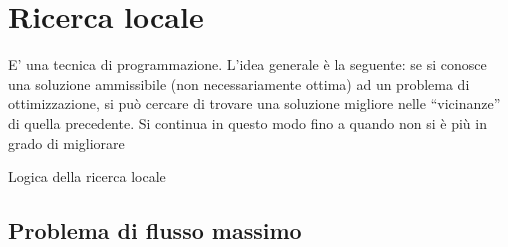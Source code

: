 
\ifsubfile
\usepackage{../settings/subfile}
\setcounter{chapter}{15}

\usepackage[newfloat, cachedir=_minted-cache, outputdir=../build]{minted}
\usepackage{../libraries/set-minted}


\fi
\chapter{Ricerca locale}

E' una tecnica di programmazione. L'idea generale è la seguente: se si conosce una soluzione ammissibile (non necessariamente ottima) ad un problema di ottimizzazione, si può cercare di trovare una soluzione migliore nelle \enquote{vicinanze} di quella precedente.
Si continua in questo modo fino a quando non si è più in grado di migliorare

\begin{minipage}{.6\linewidth}
	\begin{algorithm*}[H]
	\caption{Logica della ricerca locale}


\end{algorithm*}
\end{minipage}
\begin{minipage}{.4\linewidth}
\centering
	\pgfplotsset{width=5cm}
\end{minipage}

\section{Problema di flusso massimo}

